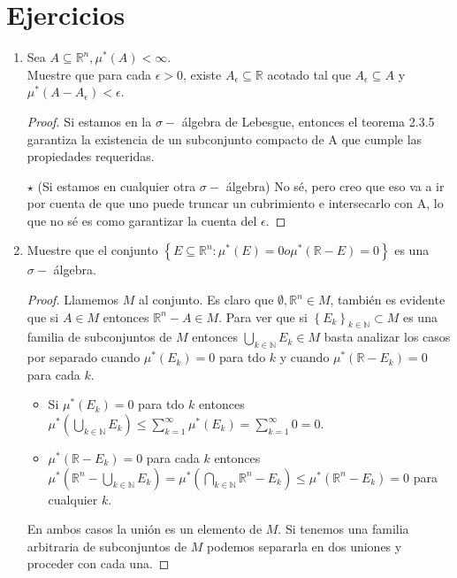 \documentclass[spanish,12pt,a4paper,openany]{book}
\begin{document}
	\section{Ejercicios}
		\begin{enumerate}
			\item Sea $A \subseteq \mathbb{R}^{n}, \mu ^{*} (A) < \infty$.\\
			Muestre que para cada $\epsilon > 0$, existe $A_{\epsilon} \subseteq \mathbb{R}$ acotado tal que $A_{\epsilon} \subseteq A$ y $\mu ^{*} (A - A_{\epsilon}) < \epsilon$.
			
			\begin{proof}
				Si estamos en la $\sigma-$ álgebra de Lebesgue, entonces el teorema 2.3.5 garantiza la existencia de un subconjunto compacto de A que cumple las propiedades requeridas.
				
				$\star$ (Si estamos en cualquier otra $\sigma-$ álgebra) No sé, pero creo que eso va a ir por cuenta de que uno puede truncar un cubrimiento e intersecarlo con A, lo que no sé es como garantizar la cuenta del $\epsilon$.
			\end{proof}
			
			\item  Muestre que el conjunto $\left\{E \subseteq \mathbb{R} ^{n} : \mu^{*} (E)  = 0 o \mu^{*} (\mathbb{R} - E)  = 0 \right\}$ es una $\sigma-$ álgebra.
			\begin{proof}
				Llamemos $ M $ al conjunto. Es claro que $\emptyset, \mathbb{R}^{n} \in M$, también es evidente que si $A \in M$ entonces $\mathbb{R}^{n} - A \in M$. Para ver que si $\left\{ E_{k}\right\}_{k \in \mathbb{N}} \subset M$ es una familia de subconjuntos de $M$ entonces $\bigcup_{k \in \mathbb{N}} E_{k} \in M$ basta analizar los casos por separado cuando $\mu^{*} (E_{k}) = 0$ para tdo $k$ y cuando $\mu^{*}(\mathbb{R}-E_{k}) = 0$ para cada $k$.\\
				
				\begin{itemize}
					\item Si  $\mu^{*} (E_{k}) = 0$ para tdo $k$  entonces $\mu^{*}(\bigcup_{k \in \mathbb{N}} E_{k}) \leq \sum_{k=1}^{\infty} \mu ^{*}(E_{k}) = \sum_{k=1}^{\infty} 0 = 0$.
					
					\item $\mu^{*}(\mathbb{R}-E_{k}) = 0$ para cada $k$ entonces $\mu^{*}(\mathbb{R}^{n} - \bigcup_{k \in \mathbb{N}} E_{k}) = \mu^{*}(\bigcap_{k \in \mathbb{N}} \mathbb{R}^{n} - E_{k}) \leq \mu^{*}(\mathbb{R}^{n} - E_{k}) = 0$ para cualquier $k$.				
				\end{itemize}   
				En ambos casos la unión es un elemento de $M$. Si tenemos una familia arbitraria de subconjuntos de $M$ podemos separarla en dos uniones y proceder con cada una. 
			\end{proof}
			

\end{enumerate}
\end{document}
